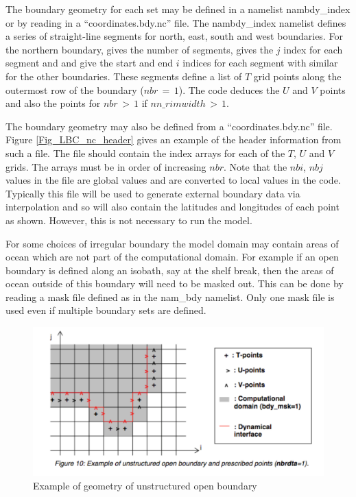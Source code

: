 The boundary geometry for each set may be defined in a namelist
nambdy\_index or by reading in a ``coordinates.bdy.nc'' file.
The
nambdy\_index namelist defines a series of straight-line
segments for
north, east, south and west boundaries. For the northern
boundary,
 gives the number of segments,  gives
the $j$
index for each segment and  and  give the
start
and end $i$ indices for each segment with similar for the other
boundaries. These segments define a list of $T$ grid points
along the
outermost row of the boundary ($nbr\,=\, 1$). The code deduces
the $U$ and
$V$ points and also the points for $nbr\,>\, 1$ if
$nn\_rimwidth\,>\,1$.

The boundary geometry may also be defined from a
``coordinates.bdy.nc'' file. Figure \ref{Fig_LBC_nc_header}
gives an example of the header information from such a file. The
file
should contain the index arrays for each of the $T$, $U$ and $V$grids. The
arrays must be in order of increasing $nbr$. Note
that the
$nbi$, $nbj$ values in the file are global values and are
converted to
local values in the code. Typically this file will be used to
generate
external boundary data via interpolation and so will also
contain the
latitudes and longitudes of each point as shown. However, this
is not
necessary to run the model. 

For some choices of irregular boundary the model domain may
contain
areas of ocean which are not part of the computational domain.
For
example if an open boundary is defined along an isobath, say at
the
shelf break, then the areas of ocean outside of this boundary
will
need to be masked out. This can be done by reading a mask file
defined
as  in the nam\_bdy namelist. Only one mask
file is
used even if multiple boundary sets are defined.

\begin{figure}[!t]      \begin{center}
\includegraphics[width=1.0\textwidth]{./TexFiles/Figures/Fig_LBC_bdy_geom.pdf}
\caption {      \label{Fig_LBC_bdy_geom}
Example of geometry of unstructured open boundary}
\end{center}   \end{figure}

